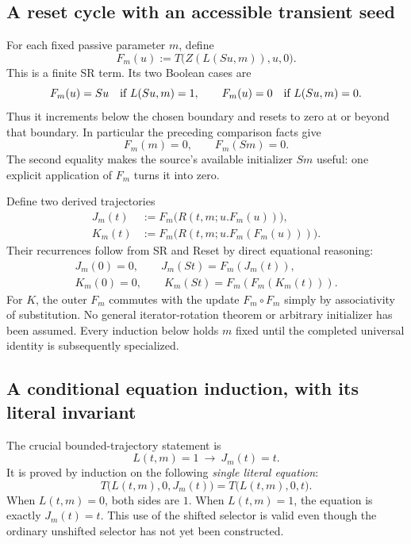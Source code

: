 \subsection{A reset cycle with an accessible transient seed}

For each fixed passive parameter $m$, define
\[
           F_m(u):=T\bigl(Z(L(Su,m)),u,0\bigr).
 \tag{F}\label{eq:sr-cycle-update}
\]
This is a finite SR term.  Its two Boolean cases are
\[
 F_m(u)=Su\quad\hbox{if }L(Su,m)=1,\qquad
 F_m(u)=0\quad\hbox{if }L(Su,m)=0.
\]
Thus it increments below the chosen boundary and resets to zero at or
beyond that boundary.  In particular the preceding comparison facts give
\[
                       F_m(m)=0,\qquad F_m(Sm)=0.
 \tag{Reset}\label{eq:sr-cycle-reset}
\]
The second equality makes the source's available initializer $Sm$
useful: one explicit application of $F_m$ turns it into zero.

Define two derived trajectories
\[
\begin{aligned}
 J_m(t)&:=F_m\bigl(R(t,m;u.F_m(u))\bigr),\\
 K_m(t)&:=F_m\bigl(R(t,m;u.F_m(F_m(u)))\bigr).
\end{aligned}
 \tag{JK}\label{eq:sr-cycle-trajectories}
\]
Their recurrences follow from SR and Reset by direct equational reasoning:
\[
\begin{gathered}
 J_m(0)=0,\qquad J_m(St)=F_m(J_m(t)),\\
 K_m(0)=0,\qquad K_m(St)=F_m(F_m(K_m(t))).
\end{gathered}
 \tag{JR,KR}\label{eq:sr-cycle-recurrences}
\]
For $K$, the outer $F_m$ commutes with the update $F_m\circ F_m$
simply by associativity of substitution.  No general iterator-rotation
theorem or arbitrary initializer has been assumed.  Every induction
below holds $m$ fixed until the completed universal identity is
subsequently specialized.

\subsection{A conditional equation induction, with its literal invariant}

The crucial bounded-trajectory statement is
\[
                   L(t,m)=1\ \longrightarrow\ J_m(t)=t.
 \tag{Run}\label{eq:sr-cycle-bounded-run}
\]
It is proved by induction on the following \emph{single literal equation}:
\[
 T\bigl(L(t,m),0,J_m(t)\bigr)
       =T\bigl(L(t,m),0,t\bigr).
 \tag{Gate}\label{eq:sr-cycle-gate}
\]
When $L(t,m)=0$, both sides are $1$.  When $L(t,m)=1$, the equation
is exactly $J_m(t)=t$.  This use of the shifted selector is valid even
though the ordinary unshifted selector has not yet been constructed.

